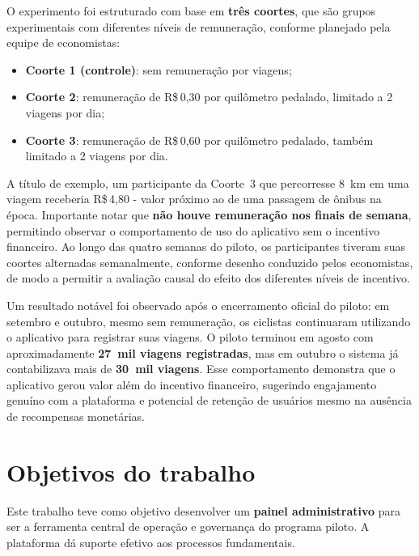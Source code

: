 O experimento foi estruturado com base em \textbf{três coortes}, que são grupos experimentais com diferentes níveis de
remuneração, conforme planejado pela equipe de economistas:
\begin{itemize}
  \item \textbf{Coorte 1 (controle)}: sem remuneração por viagens;
  \item \textbf{Coorte 2}: remuneração de R\$\,0,30 por quilômetro pedalado,
        limitado a 2 viagens por dia;
  \item \textbf{Coorte 3}: remuneração de R\$\,0,60 por quilômetro pedalado,
        também limitado a 2 viagens por dia.
\end{itemize}
A título de exemplo, um participante da Coorte~3 que percorresse 8~km em uma
viagem receberia R\$\,4,80 - valor próximo ao de uma passagem de ônibus na
época. Importante notar que \textbf{não houve remuneração nos finais de semana},
permitindo observar o comportamento de uso do aplicativo sem o incentivo
financeiro. Ao longo das quatro semanas do piloto, os participantes tiveram suas
coortes alternadas semanalmente, conforme desenho conduzido pelos economistas,
de modo a permitir a avaliação causal do efeito dos diferentes níveis de
incentivo.

Um resultado notável foi observado após o 
encerramento oficial do piloto: em setembro e outubro, mesmo sem remuneração, 
os ciclistas continuaram utilizando o aplicativo para registrar suas viagens. 
O piloto terminou em agosto com aproximadamente \textbf{27~mil viagens 
registradas}, mas em outubro o sistema já contabilizava mais de \textbf{30~mil 
viagens}. Esse comportamento demonstra que o aplicativo gerou valor além do 
incentivo financeiro, sugerindo engajamento genuíno com a plataforma e potencial 
de retenção de usuários mesmo na ausência de recompensas monetárias.


\section{Objetivos do trabalho}
\label{sec:objetivos-trabalho}
Este trabalho teve como objetivo desenvolver um \textbf{painel administrativo} para ser a ferramenta central de operação e governança do programa piloto. A plataforma dá suporte efetivo aos processos fundamentais.

